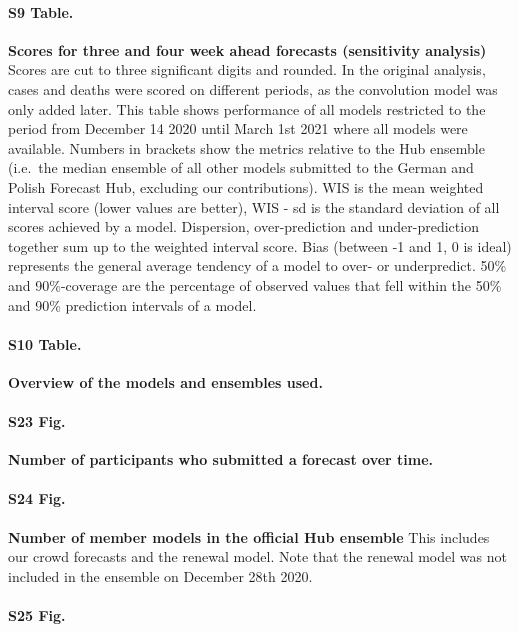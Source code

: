 \documentclass[10pt,letterpaper]{article}
\begin{document}
\paragraph{S9 Table.}
\label{tab:score-table-late-4}

\textbf{Scores for three and four week ahead forecasts (sensitivity analysis)}
Scores are cut to three significant digits and rounded. In the original
analysis, cases and deaths were scored on different periods, as the
convolution model was only added later. This table shows performance of
all models restricted to the period from December 14 2020 until March
1st 2021 where all models were available. Numbers in brackets show the
metrics relative to the Hub ensemble (i.e.~the median ensemble of all
other models submitted to the German and Polish Forecast Hub, excluding
our contributions). WIS is the mean weighted interval score (lower
values are better), WIS - sd is the standard deviation of all scores
achieved by a model. Dispersion, over-prediction and under-prediction
together sum up to the weighted interval score. Bias (between -1 and 1,
0 is ideal) represents the general average tendency of a model to over-
or underpredict. 50\% and 90\%-coverage are the percentage of observed
values that fell within the 50\% and 90\% prediction intervals of a
model.

\paragraph{S10 Table.}
\label{tab:table-ensemble-versions}

\textbf{Overview of the models and ensembles used.}

\paragraph{S23 Fig.}
\label{fig:num-forecasters}

\textbf{Number of participants who submitted a forecast over time.}

\paragraph{S24 Fig.}
\label{fig:num-ensemble-members}

\textbf{Number of member models in the official Hub ensemble} This
includes our crowd forecasts and the renewal model. Note that the
renewal model was not included in the ensemble on December 28th 2020.

\paragraph{S25 Fig.}
\label{fig:compare-forecasters}
\end{document}
